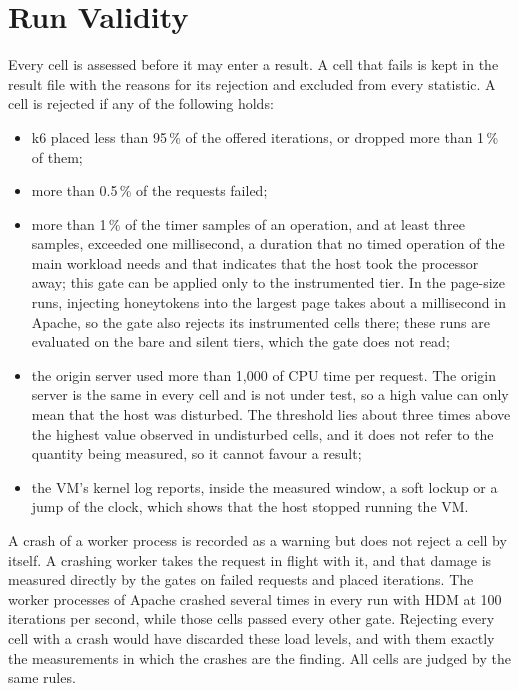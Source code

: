 \documentclass{rptuma}
\begin{document}
\section{Run Validity}
\label{sec:AB.validity}

Every cell is assessed before it may enter a result. A cell that fails is kept in the result file
with the reasons for its rejection and excluded from every statistic. A cell is rejected if any of
the following holds:
\begin{itemize}
  \item k6 placed less than 95\,\% of the offered iterations, or dropped more than 1\,\% of them;
  \item more than 0.5\,\% of the requests failed;
  \item more than 1\,\% of the timer samples of an operation, and at least three samples, exceeded
    one millisecond, a duration that no timed operation of the main workload needs and that
    indicates that the host took the processor away; this gate can be applied only to the
    instrumented tier. In the page-size runs, injecting honeytokens into the largest page takes
    about a millisecond in Apache, so the gate also rejects its instrumented cells there;
    these runs are evaluated on the bare and silent tiers, which the gate does not read;
  \item the origin server used more than 1,000\us{} of CPU time per request. The origin server is
    the same in every cell and is not under test, so a high value can only mean that the host was
    disturbed. The threshold lies about three times above the highest value observed in undisturbed
    cells, and it does not refer to the quantity being measured, so it cannot favour a result;
  \item the VM's kernel log reports, inside the measured window, a soft lockup or a jump of the
    clock, which shows that the host stopped running the VM.
\end{itemize}
A crash of a worker process is recorded as a warning but does not reject a cell by itself. A
crashing worker takes the request in flight with it, and that damage is measured directly by the
gates on failed requests and placed iterations. The worker processes of Apache crashed
several times in every run with HDM at 100 iterations per second, while those cells passed every
other gate. Rejecting every cell with a crash would have discarded these load levels, and with them
exactly the measurements in which the crashes are the finding. All cells are judged by the same rules.
\end{document}
